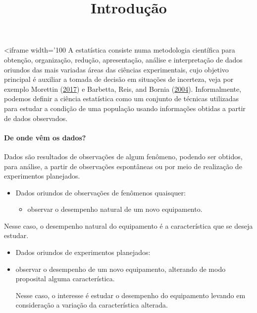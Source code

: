 \documentclass[
]{article}
\title{Introdução}
\author{}
\date{\vspace{-2.5em}}
\providecommand{\tightlist}{%
  \setlength{\itemsep}{0pt}\setlength{\parskip}{0pt}}
\begin{document}
\maketitle

\newtheorem{exemplo}{Exemplo}
\newtheorem{assumption}{Assumption}
\renewcommand{\thesection}{\Alph{Seções}}
<iframe width='100%
A estatística consiste numa metodologia científica para obtenção,
organização, redução, apresentação, análise e interpretação de dados
oriundos das mais variadas áreas das ciências experimentais, cujo
objetivo principal é auxiliar a tomada de decisão em situações de
incerteza, veja por exemplo Morettin
(\protect\hyperlink{ref-bussab}{2017}) e Barbetta, Reis, and Bornia
(\protect\hyperlink{ref-barbetta2004}{2004}). Informalmente, podemos
definir a ciência estatística como um conjunto de técnicas utilizadas
para estudar a condição de uma população usando informações obtidas a
partir de dados observados.

\hypertarget{de-onde-vuxeam-os-dados}{%
\paragraph{De onde vêm os dados?}\label{de-onde-vuxeam-os-dados}}

Dados são resultados de observações de algum fenômeno, podendo ser
obtidos, para análise, a partir de observações espontâneas ou por meio
de realização de experimentos planejados.

\begin{itemize}
\tightlist
\item
  Dados oriundos de observações de fenômenos quaisquer:

  \begin{itemize}
  \tightlist
  \item
    observar o desempenho natural de um novo equipamento.
  \end{itemize}
\end{itemize}

Nesse caso, o desempenho natural do equipamento é a característica que
se deseja estudar.

\begin{itemize}
\item
  Dados oriundos de experimentos planejados:
\item
  observar o desempenho de um novo equipamento, alterando de modo
  proposital alguma característica.

  Nesse caso, o interesse é estudar o desempenho do equipamento levando
  em consideração a variação da característica alterada.
\end{itemize}
\end{document}

